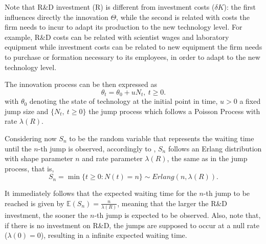 
Note that R\&D investment (R) is different from investment costs ($\delta K$): the first influences directly the innovation $\Theta$, while the second is related with costs the firm needs to incur to adapt its production to the new technology level.
For example, R\&D costs can be related with scientist wages and laboratory equipment while investment costs can be related to new equipment the firm needs to purchase or formation necessary to its employees, in order to adapt to the new technology level.



The innovation process can be then expressed as
$$\theta_t=\theta_0+uN_t, \ t\geq 0.$$ 
with $\theta_0$ denoting the state of technology at the initial point in time, $u>0$ a fixed jump size and $\{ N_t, \ t \geq 0 \}$ the jump process which follows a Poisson Process with rate $\lambda(R)$. 

Considering now $S_n$ to be the random variable that represents the waiting time until the $n$-th jump is observed, accordingly to \cite{ross}, $S_n$ follows an Erlang distribution with shape parameter $n$ and rate parameter $\lambda(R)$, the same as in the jump process, that is,
$$S_n=\min \{t\geq 0: N(t)=n \} \sim Erlang(n,\lambda(R)).$$

It immediately follows that the expected waiting time for the $n$-th jump to be reached is given by $\mathds{E}(S_n)=\frac{n}{\lambda(R)}$, meaning that the larger the R\&D investment, the sooner the $n$-th jump is expected to be observed. Also, note that, if there is no investment on R\&D, the jumps are supposed to occur at a null rate ($\lambda(0)=0$), resulting in a infinite expected waiting time.

